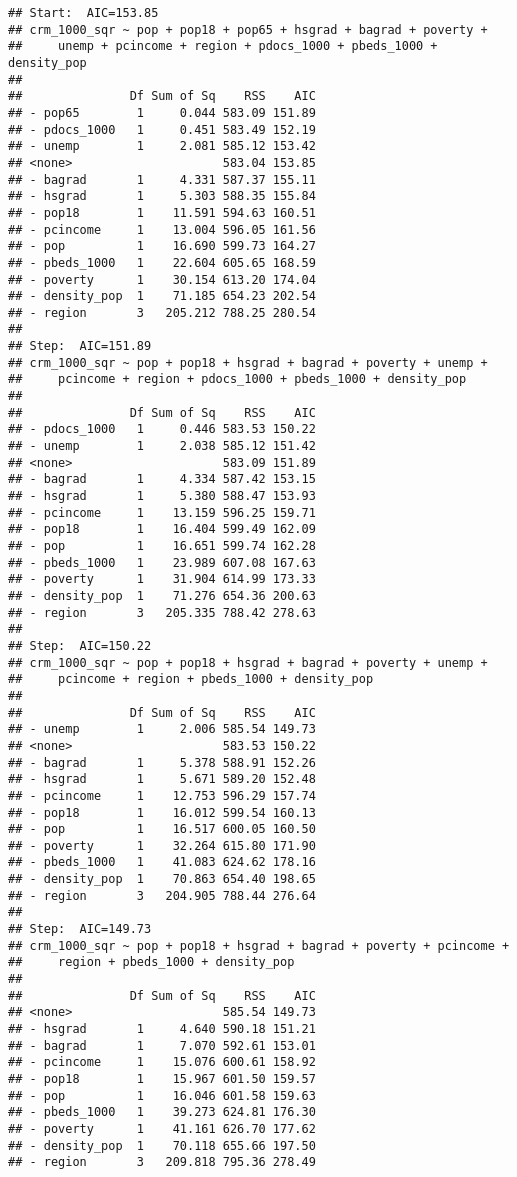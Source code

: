 \documentclass[
]{article}
\begin{document}
\begin{verbatim}
## Start:  AIC=153.85
## crm_1000_sqr ~ pop + pop18 + pop65 + hsgrad + bagrad + poverty + 
##     unemp + pcincome + region + pdocs_1000 + pbeds_1000 + density_pop
## 
##               Df Sum of Sq    RSS    AIC
## - pop65        1     0.044 583.09 151.89
## - pdocs_1000   1     0.451 583.49 152.19
## - unemp        1     2.081 585.12 153.42
## <none>                     583.04 153.85
## - bagrad       1     4.331 587.37 155.11
## - hsgrad       1     5.303 588.35 155.84
## - pop18        1    11.591 594.63 160.51
## - pcincome     1    13.004 596.05 161.56
## - pop          1    16.690 599.73 164.27
## - pbeds_1000   1    22.604 605.65 168.59
## - poverty      1    30.154 613.20 174.04
## - density_pop  1    71.185 654.23 202.54
## - region       3   205.212 788.25 280.54
## 
## Step:  AIC=151.89
## crm_1000_sqr ~ pop + pop18 + hsgrad + bagrad + poverty + unemp + 
##     pcincome + region + pdocs_1000 + pbeds_1000 + density_pop
## 
##               Df Sum of Sq    RSS    AIC
## - pdocs_1000   1     0.446 583.53 150.22
## - unemp        1     2.038 585.12 151.42
## <none>                     583.09 151.89
## - bagrad       1     4.334 587.42 153.15
## - hsgrad       1     5.380 588.47 153.93
## - pcincome     1    13.159 596.25 159.71
## - pop18        1    16.404 599.49 162.09
## - pop          1    16.651 599.74 162.28
## - pbeds_1000   1    23.989 607.08 167.63
## - poverty      1    31.904 614.99 173.33
## - density_pop  1    71.276 654.36 200.63
## - region       3   205.335 788.42 278.63
## 
## Step:  AIC=150.22
## crm_1000_sqr ~ pop + pop18 + hsgrad + bagrad + poverty + unemp + 
##     pcincome + region + pbeds_1000 + density_pop
## 
##               Df Sum of Sq    RSS    AIC
## - unemp        1     2.006 585.54 149.73
## <none>                     583.53 150.22
## - bagrad       1     5.378 588.91 152.26
## - hsgrad       1     5.671 589.20 152.48
## - pcincome     1    12.753 596.29 157.74
## - pop18        1    16.012 599.54 160.13
## - pop          1    16.517 600.05 160.50
## - poverty      1    32.264 615.80 171.90
## - pbeds_1000   1    41.083 624.62 178.16
## - density_pop  1    70.863 654.40 198.65
## - region       3   204.905 788.44 276.64
## 
## Step:  AIC=149.73
## crm_1000_sqr ~ pop + pop18 + hsgrad + bagrad + poverty + pcincome + 
##     region + pbeds_1000 + density_pop
## 
##               Df Sum of Sq    RSS    AIC
## <none>                     585.54 149.73
## - hsgrad       1     4.640 590.18 151.21
## - bagrad       1     7.070 592.61 153.01
## - pcincome     1    15.076 600.61 158.92
## - pop18        1    15.967 601.50 159.57
## - pop          1    16.046 601.58 159.63
## - pbeds_1000   1    39.273 624.81 176.30
## - poverty      1    41.161 626.70 177.62
## - density_pop  1    70.118 655.66 197.50
## - region       3   209.818 795.36 278.49
\end{verbatim}
\end{document}
